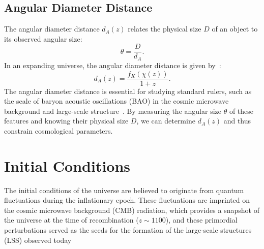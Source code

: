 \subsection{Angular Diameter Distance}
The angular diameter distance \( d_A(z) \) relates the physical size \( D \) of an object to its observed angular size:
\begin{equation}
    \theta = \frac{D}{d_A}.
    \label{eq:angular_diameter}
\end{equation}
In an expanding universe, the angular diameter distance is given by~\citep{1999astro.ph..5116H}:
\begin{equation}
    d_A(z) = \frac{f_K(\chi(z))}{1 + z}.
    \label{eq:angular_diameter_distance}
\end{equation}
The angular diameter distance is essential for studying standard rulers, such as the scale of baryon acoustic oscillations (BAO) in the cosmic microwave background and large-scale structure~\citep{2005ApJ...633..560E}. By measuring the angular size \( \theta \) of these features and knowing their physical size \( D \), we can determine \( d_A(z) \) and thus constrain cosmological parameters.

\section{Initial Conditions}
\label{sec:initial_conditions}
The initial conditions of the universe are believed to originate from quantum fluctuations during the inflationary epoch. These fluctuations are imprinted on the cosmic microwave background (CMB) radiation, which provides a snapshot of the universe at the time of recombination ($z \sim 1100$), and these primordial perturbations served as the seeds for the formation of the large-scale structures (LSS) observed today

